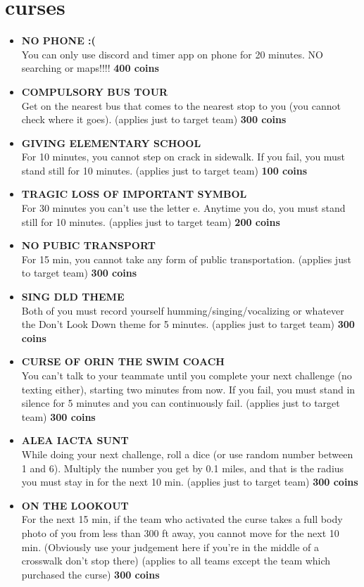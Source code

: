 \documentclass{article}
\begin{document}
\section{curses}
\begin{itemize}
    \setcounter{enumi}{-1}
    \item \textbf{NO PHONE :(} \\ You can only use discord and timer app on phone for 20 minutes. NO searching or maps!!!! \textbf{400 coins }
    \item \textbf{COMPULSORY BUS TOUR} \\Get on the nearest bus that comes to the nearest stop to you (you cannot check where it goes). (applies just to target team) \textbf{300 coins}
    \item \textbf{GIVING ELEMENTARY SCHOOL} \\ For 10 minutes, you cannot step on crack in sidewalk. If you fail, you must stand still for 10 minutes. (applies just to target team) \textbf{100 coins}
    \item \textbf{TRAGIC LOSS OF IMPORTANT SYMBOL} \\ For 30 minutes you can't use the letter e. Anytime you do, you must stand still for 10 minutes. (applies just to target team) \textbf{200 coins}
    \item \textbf{NO PUBIC TRANSPORT} \\ For 15 min, you cannot take any form of public transportation. (applies just to target team) \textbf{300 coins}
    \item \textbf{SING DLD THEME} \\ Both of you must record yourself humming/singing/vocalizing or whatever the Don't Look Down theme for 5 minutes. (applies just to target team) \textbf{300 coins}
    \item \textbf{CURSE OF ORIN THE SWIM COACH} \\ You can't talk to your teammate until you complete your next challenge (no texting either), starting two minutes from now. If you fail, you must stand in silence for 5 minutes and you can continuously fail. (applies just to target team) \textbf{300 coins}
    \item \textbf{ALEA IACTA SUNT} \\ While doing your next challenge, roll a dice (or use random number between 1 and 6). Multiply the number you get by 0.1 miles, and that is the radius you must stay in for the next 10 min. (applies just to target team) \textbf{300 coins}
    \item \textbf{ON THE LOOKOUT} \\ For the next 15 min, if the team who activated the curse takes a full body photo of you from less than 300 ft away, you cannot move for the next 10 min. (Obviously use your judgement here if you're in the middle of a crosswalk don't stop there) (applies to all teams except the team which purchased the curse) \textbf{300 coins}
\end{itemize}
\end{document}
